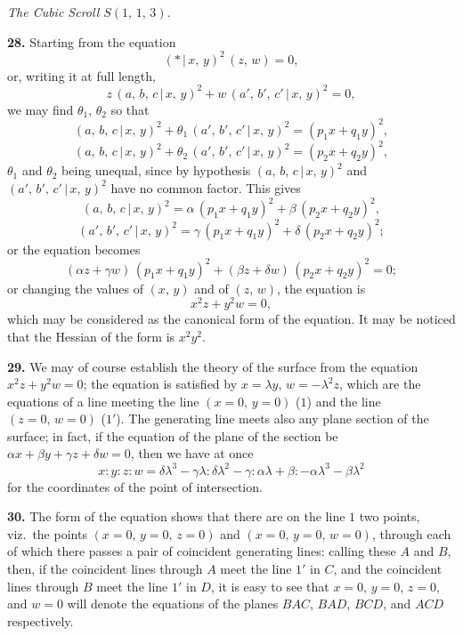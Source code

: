 \documentclass[11pt,a4paper]{article}
\providecommand{\mid}{\,|\,}
\begin{document}
\bigskip

\begin{center}
\textit{The Cubic Scroll $S(1,\,1,\,3)$.}
\end{center}

\textbf{28.} Starting from the equation
\[
(*\mid x,\,y)^{2}\,(z,\,w) = 0,
\]
or, writing it at full length,
\[
z\,(a,\,b,\,c\mid x,\,y)^{2} + w\,(a',\,b',\,c'\mid x,\,y)^{2} = 0,
\]
we may find $\theta_{1},\,\theta_{2}$ so that
\[
(a,\,b,\,c\mid x,\,y)^{2} + \theta_{1}\,(a',\,b',\,c'\mid x,\,y)^{2} = (p_{1}x + q_{1}y)^{2},
\]
\[
(a,\,b,\,c\mid x,\,y)^{2} + \theta_{2}\,(a',\,b',\,c'\mid x,\,y)^{2} = (p_{2}x + q_{2}y)^{2},
\]
$\theta_{1}$ and $\theta_{2}$ being unequal, since by hypothesis $(a,\,b,\,c\mid x,\,y)^{2}$ and $(a',\,b',\,c'\mid x,\,y)^{2}$ have no common factor. This gives
\[
(a,\,b,\,c\mid x,\,y)^{2} = \alpha\,(p_{1}x + q_{1}y)^{2} + \beta\,(p_{2}x + q_{2}y)^{2},
\]
\[
(a',\,b',\,c'\mid x,\,y)^{2} = \gamma\,(p_{1}x + q_{1}y)^{2} + \delta\,(p_{2}x + q_{2}y)^{2};
\]
or the equation becomes
\[
(\alpha z + \gamma w)\,(p_{1}x + q_{1}y)^{2} + (\beta z + \delta w)\,(p_{2}x + q_{2}y)^{2} = 0;
\]
or changing the values of $(x,\,y)$ and of $(z,\,w)$, the equation is
\[
x^{2}z + y^{2}w = 0,
\]
which may be considered as the canonical form of the equation. It may be noticed that the Hessian of the form is $x^{2}y^{2}$.

\medskip

\textbf{29.} We may of course establish the theory of the surface from the equation $x^{2}z + y^{2}w = 0$; the equation is satisfied by $x = \lambda y$, $w = -\lambda^{2} z$, which are the equations of a line meeting the line $(x = 0,\,y = 0)$ ($1$) and the line $(z = 0,\,w = 0)$ ($1'$). The generating line meets also any plane section of the surface; in fact, if the equation of the plane of the section be $\alpha x + \beta y + \gamma z + \delta w = 0$, then we have at once
\[
x : y : z : w = \delta\lambda^{3} - \gamma\lambda : \delta\lambda^{2} - \gamma : \alpha\lambda + \beta : -\alpha\lambda^{3} - \beta\lambda^{2}
\]
for the coordinates of the point of intersection.

\medskip

\textbf{30.} The form of the equation shows that there are on the line $1$ two points, viz.\ the points $(x = 0,\,y = 0,\,z = 0)$ and $(x = 0,\,y = 0,\,w = 0)$, through each of which there passes a pair of coincident generating lines: calling these $A$ and $B$, then, if the coincident lines through $A$ meet the line $1'$ in $C$, and the coincident lines through $B$ meet the line $1'$ in $D$, it is easy to see that $x = 0$, $y = 0$, $z = 0$, and $w = 0$ will denote the equations of the planes $BAC$, $BAD$, $BCD$, and $ACD$ respectively.
\end{document}
